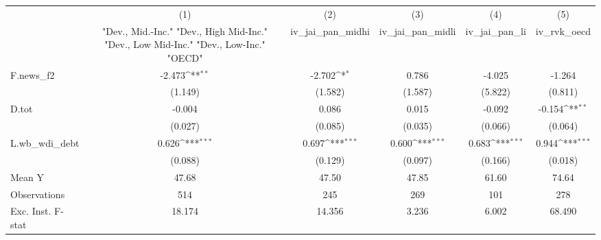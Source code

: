 {
\def\sym#1{\ifmmode^{#1}\else\(^{#1}\)\fi}
\begin{tabular}{l*{5}{c}}
\toprule
            &\multicolumn{1}{c}{(1)}&\multicolumn{1}{c}{(2)}&\multicolumn{1}{c}{(3)}&\multicolumn{1}{c}{(4)}&\multicolumn{1}{c}{(5)}\\
            &\multicolumn{1}{c}{ "Dev., Mid.-Inc." "Dev., High Mid-Inc." "Dev., Low Mid-Inc." "Dev., Low-Inc." "OECD" }&\multicolumn{1}{c}{iv\_jai\_pan\_midhi}&\multicolumn{1}{c}{iv\_jai\_pan\_midli}&\multicolumn{1}{c}{iv\_jai\_pan\_li}&\multicolumn{1}{c}{iv\_rvk\_oecd}\\
\midrule
F.news\_f2   &      -2.473\sym{**} &      -2.702\sym{*}  &       0.786         &      -4.025         &      -1.264         \\
            &     (1.149)         &     (1.582)         &     (1.587)         &     (5.822)         &     (0.811)         \\
\addlinespace
D.tot       &      -0.004         &       0.086         &       0.015         &      -0.092         &      -0.154\sym{**} \\
            &     (0.027)         &     (0.085)         &     (0.035)         &     (0.066)         &     (0.064)         \\
\addlinespace
L.wb\_wdi\_debt&       0.626\sym{***}&       0.697\sym{***}&       0.600\sym{***}&       0.683\sym{***}&       0.944\sym{***}\\
            &     (0.088)         &     (0.129)         &     (0.097)         &     (0.166)         &     (0.018)         \\
\midrule
Mean Y      &       47.68         &       47.50         &       47.85         &       61.60         &       74.64         \\
Observations&         514         &         245         &         269         &         101         &         278         \\
Exc. Inst. F-stat&      18.174         &      14.356         &       3.236         &       6.002         &      68.490         \\
\bottomrule
\end{tabular}
}
